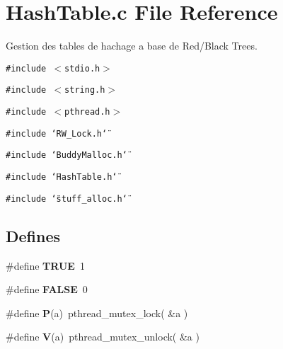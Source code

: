 \section{Hash\-Table.c File Reference}
\label{HashTable_8c}
Gestion des tables de hachage a base de Red/Black Trees. 

{\tt \#include $<$stdio.h$>$}\par
{\tt \#include $<$string.h$>$}\par
{\tt \#include $<$pthread.h$>$}\par
{\tt \#include \char`\"{}RW\_\-Lock.h\char`\"{}}\par
{\tt \#include \char`\"{}Buddy\-Malloc.h\char`\"{}}\par
{\tt \#include \char`\"{}Hash\-Table.h\char`\"{}}\par
{\tt \#include \char`\"{}stuff\_\-alloc.h\char`\"{}}\par
\subsection*{Defines}
\begin{CompactItemize}
\item 
\#define {\bf TRUE}\ 1
\item 
\#define {\bf FALSE}\ 0
\item 
\#define {\bf P}(a)\ pthread\_\-mutex\_\-lock( \&a )
\item 
\#define {\bf V}(a)\ pthread\_\-mutex\_\-unlock( \&a )
\end{CompactItemize}
